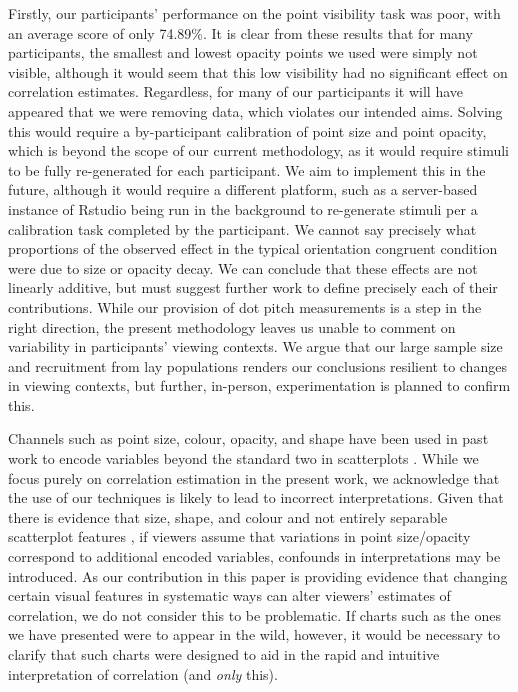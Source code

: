 \documentclass[manuscript, review, anonymous, screen]{acmart}
\begin{document}
Firstly, our participants' performance on the point visibility task was
poor, with an average score of only 74.89\%. It is clear from these
results that for many participants, the smallest and lowest opacity
points we used were simply not visible, although it would seem that this
low visibility had no significant effect on correlation estimates.
Regardless, for many of our participants it will have appeared that we
were removing data, which violates our intended aims. Solving this would
require a by-participant calibration of point size and point opacity,
which is beyond the scope of our current methodology, as it would
require stimuli to be fully re-generated for each participant. We aim to
implement this in the future, although it would require a different
platform, such as a server-based instance of Rstudio being run in the
background to re-generate stimuli per a calibration task completed by
the participant. We cannot say precisely what proportions of the
observed effect in the typical orientation congruent condition were due
to size or opacity decay. We can conclude that these effects are not
linearly additive, but must suggest further work to define precisely
each of their contributions. While our provision of dot pitch
measurements is a step in the right direction, the present methodology
leaves us unable to comment on variability in participants' viewing
contexts. We argue that our large sample size and recruitment from lay
populations renders our conclusions resilient to changes in viewing
contexts, but further, in-person, experimentation is planned to confirm
this.

Channels such as point size, colour, opacity, and shape have been used
in past work to encode variables beyond the standard two in scatterplots
\citep{hong_2021, smart_2019}. While we focus purely on correlation
estimation in the present work, we acknowledge that the use of our
techniques is likely to lead to incorrect interpretations. Given that
there is evidence that size, shape, and colour and not entirely
separable scatterplot features \citep{smart_2019}, if viewers assume
that variations in point size/opacity correspond to additional encoded
variables, confounds in interpretations may be introduced. As our
contribution in this paper is providing evidence that changing certain
visual features in systematic ways can alter viewers' estimates of
correlation, we do not consider this to be problematic. If charts such
as the ones we have presented were to appear in the wild, however, it
would be necessary to clarify that such charts were designed to aid in
the rapid and intuitive interpretation of correlation (and \emph{only}
this).
\end{document}
